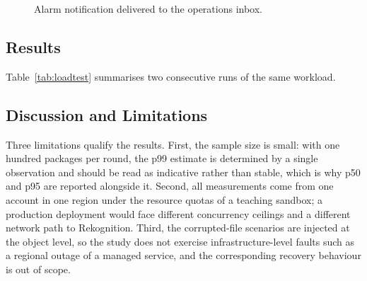 \begin{figure}[htbp]
  \centering
  \caption{Alarm notification delivered to the operations inbox.}
  \label{fig:alarm}
\end{figure}

\subsection{Results}\label{sec:results}

Table~\ref{tab:loadtest} summarises two consecutive runs of the same workload.

\begin{table}[htbp]
  \centering
  \small
  \caption{Load test results (100 applications in 60\,s, two rounds).}
  \label{tab:loadtest}
\end{table}

%

\subsection{Discussion and Limitations}\label{sec:limits}

Three limitations qualify the results. First, the sample size is small: with one
hundred packages per round, the p99 estimate is determined by a single
observation and should be read as indicative rather than stable, which is why p50
and p95 are reported alongside it. Second, all measurements come from one
account in one region under the resource quotas of a teaching sandbox; a
production deployment would face different concurrency ceilings and a different
network path to Rekognition. Third, the corrupted-file scenarios are injected at
the object level, so the study does not exercise infrastructure-level faults such
as a regional outage of a managed service, and the corresponding recovery
behaviour is out of scope.


